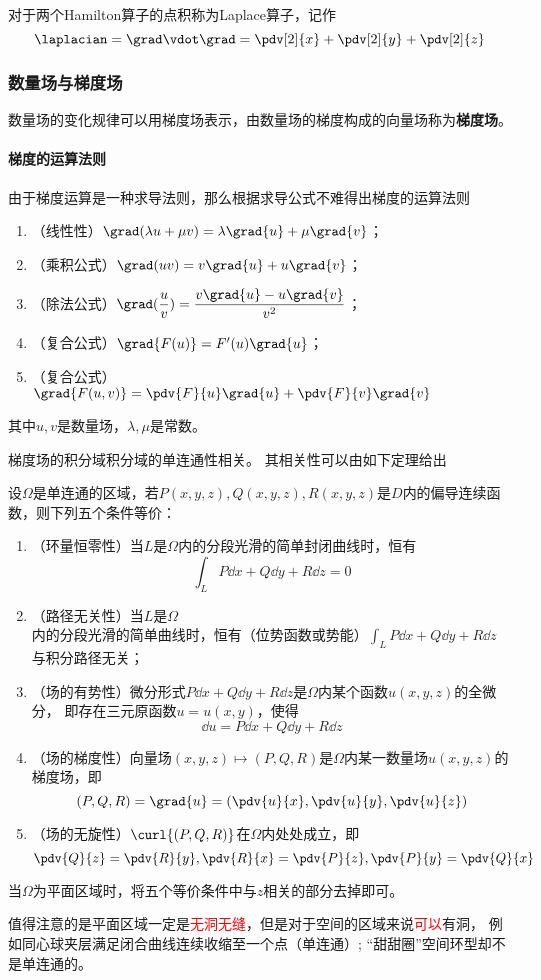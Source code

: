 对于两个Hamilton算子的点积称为Laplace算子，记作
\[ \laplacian = \grad \vdot \grad = \pdv[2]{x} + \pdv[2]{y} + \pdv[2]{z} \]

\subsubsection{数量场与梯度场}
数量场的变化规律可以用梯度场表示，由数量场的梯度构成的向量场称为\textbf{\textsf{梯度场}}。

\paragraph{梯度的运算法则}
由于梯度运算是一种求导法则，那么根据求导公式不难得出梯度的运算法则
\begin{enumerate}[(1)]
    \item （线性性）$\grad(\lambda u + \mu v) = \lambda\grad{u} + \mu\grad{v}$；
    \item （乘积公式）$\grad(uv) = v\grad{u} + u\grad{v}$；
    \item （除法公式）$\grad(\dfrac{u}{v}) = \dfrac{v\grad{u}-u\grad{v}}{v^2}$；
    \item （复合公式）$\grad{F(u)} = F'(u)\grad{u}$；
    \item （复合公式）$\grad{F(u,v)} = \pdv{F}{u}\grad{u} + \pdv{F}{v}\grad{v}$
\end{enumerate}
其中$u,v$是数量场，$\lambda,\mu$是常数。

梯度场的积分域积分域的单连通性相关。
其相关性可以由如下定理给出
\begin{theorem}
    设$\Omega$是单连通的区域，若$P(x,y,z),Q(x,y,z),R(x,y,z)$是$D$内的偏导连续函数，则下列五个条件等价：
    \begin{enumerate}[(1)]
        \item （环量恒零性）当$L$是$\Omega$内的分段光滑的简单封闭曲线时，恒有
              \[ \int_L P\dd{x} + Q\dd{y} + R\dd{z} = 0 \]
        \item （路径无关性）当$L$是$\Omega$内的分段光滑的简单曲线时，恒有（位势函数或势能）$\displaystyle\int_L P\dd{x}+Q\dd{y}+R\dd{z}$
              与积分路径无关；
        \item （场的有势性）微分形式$P\dd{x}+Q\dd{y}+R\dd{z}$是$\Omega$内某个函数$u(x,y,z)$的全微分，
              即存在三元原函数$u=u(x,y)$，使得
              \[ \dd{u} = P\dd{x}+Q\dd{y}+R\dd{z} \]
        \item （场的梯度性）向量场$(x,y,z)\mapsto(P,Q,R)$是$\Omega$内某一数量场$u(x,y,z)$的梯度场，即
              \[ (P,Q,R)=\grad{u}=\left(\pdv{u}{x},\pdv{u}{y},\pdv{u}{z}\right) \]
        \item （场的无旋性）$\curl{(P,Q,R)}$在$\Omega$内处处成立，即
              \[ \pdv{Q}{z} = \pdv{R}{y},\pdv{R}{x}=\pdv{P}{z},\pdv{P}{y}=\pdv{Q}{x} \]
    \end{enumerate}
    当$\Omega$为平面区域时，将五个等价条件中与$z$相关的部分去掉即可。
\end{theorem}
值得注意的是平面区域一定是\textcolor{red}{无洞无缝}，但是对于空间的区域来说\textcolor{red}{可以}有洞，
例如同心球夹层满足闭合曲线连续收缩至一个点（单连通）; “甜甜圈”空间环型却不是单连通的。

